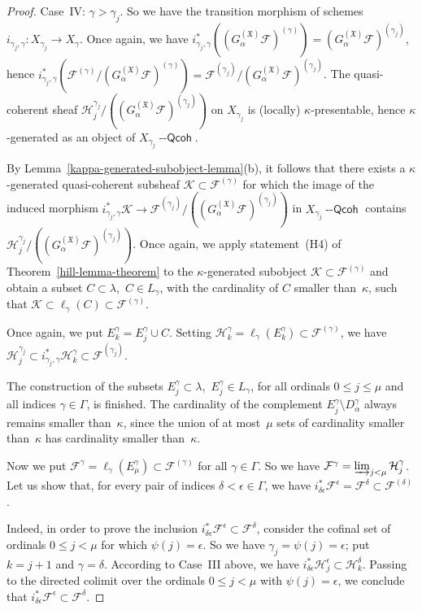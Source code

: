 \documentclass[12pt,a4paper]{amsart}
\newcommand{\+}{\protect\nobreakdash-}
\renewcommand{\:}{\colon}
\newcommand{\rarrow}{\longrightarrow}
\newcommand{\Qcoh}{{\operatorname{\mathsf{--Qcoh}}}}
\newcommand{\cK}{\mathcal K}
\newcommand{\cF}{\mathcal F}
\newcommand{\cH}{\mathcal H}
\newcommand{\fX}{\mathfrak X}
\newcommand{\rF}{\mathscr F}
\theoremstyle{plain}
\theoremstyle{definition}
\begin{document}
\begin{proof}
 Case~IV: $\gamma>\gamma_j$.
 So we have the transition morphism of schemes $i_{\gamma_j,\gamma}\:
X_{\gamma_j}\rarrow X_\gamma$.
 Once again, we have
$i^*_{\gamma_j,\gamma}((G^{(\fX)}_\alpha\rF)^{(\gamma)})
=(G^{(\fX)}_\alpha\rF)^{(\gamma_j)}$, hence
$i^*_{\gamma_j,\gamma}(\rF^{(\gamma)}/(G^{(\fX)}_\alpha\rF)^{(\gamma)})
=\rF^{(\gamma_j)}/(G^{(\fX)}_\alpha\rF)^{(\gamma_j)}$.
 The quasi-coherent sheaf
$\cH_j^{\gamma_j}/((G^{(\fX)}_\alpha\rF)^{(\gamma_j)})$
on $X_{\gamma_j}$ is (locally) $\kappa$\+presentable, hence
$\kappa$\+generated as an object of $X_{\gamma_j}\Qcoh$.

 By Lemma~\ref{kappa-generated-subobject-lemma}(b), it follows that
there exists a $\kappa$\+generated quasi-coherent subsheaf
$\cK\subset\rF^{(\gamma)}$ for which the image of the induced
morphism $i^*_{\gamma_j,\gamma}\cK\rarrow
\rF^{(\gamma_j)}/((G^{(\fX)}_\alpha\rF)^{(\gamma_j)})$
in $X_{\gamma_j}\Qcoh$ contains
$\cH_j^{\gamma_j}/((G^{(\fX)}_\alpha\rF)^{(\gamma_j)})$.
 Once again, we apply statement~(H4) of
Theorem~\ref{hill-lemma-theorem} to the $\kappa$\+generated subobject
$\cK\subset\rF^{(\gamma)}$ and obtain a subset $C\subset\lambda$,
\,$C\in L_\gamma$, with the cardinality of $C$ smaller than~$\kappa$,
such that $\cK\subset\ell_\gamma(C)\subset\rF^{(\gamma)}$.

 Once again, we put $E_k^\gamma=E_j^\gamma\cup C$.
 Setting $\cH_k^\gamma=\ell_\gamma(E_k^\gamma)\subset\rF^{(\gamma)}$,
we have $\cH_j^{\gamma_j}\subset i_{\gamma_j,\gamma}^*\cH_k^\gamma
\subset\rF^{(\gamma_j)}$.

 The construction of the subsets $E_j^\gamma\subset\lambda$,
\,$E_j^\gamma\in L_\gamma$, for all ordinals $0\le j\le\mu$ and
all indices $\gamma\in\Gamma$, is finished.
 The cardinality of the complement $E_j^\gamma\setminus
D_\alpha^\gamma$ always remains smaller than~$\kappa$, since
the union of at most~$\mu$ sets of cardinality smaller than~$\kappa$
has cardinality smaller than~$\kappa$.

 Now we put $\cF^\gamma=\ell_\gamma(E_\mu^\gamma)\subset\rF^{(\gamma)}$
for all $\gamma\in\Gamma$.
 So we have $\cF^\gamma=\varinjlim_{j<\mu}\cH_j^\gamma$.
 Let us show that, for every pair of indices $\delta<\epsilon\in\Gamma$,
we have $i^*_{\delta\epsilon}\cF^\epsilon=\cF^\delta
\subset\rF^{(\delta)}$.

 Indeed, in order to prove the inclusion
$i^*_{\delta\epsilon}\cF^\epsilon\subset\cF^\delta$, consider
the cofinal set of ordinals $0\le j<\mu$ for which $\psi(j)=\epsilon$.
 So we have $\gamma_j=\psi(j)=\epsilon$; put $k=j+1$ and
$\gamma=\delta$.
 According to Case~III above, we have
$i_{\delta\epsilon}^*\cH_j^\epsilon\subset\cH_k^\delta$.
 Passing to the directed colimit over the ordinals $0\le j<\mu$
with $\psi(j)=\epsilon$, we conclude that
$i^*_{\delta\epsilon}\cF^\epsilon\subset\cF^\delta$.


\end{proof}
\end{document}
